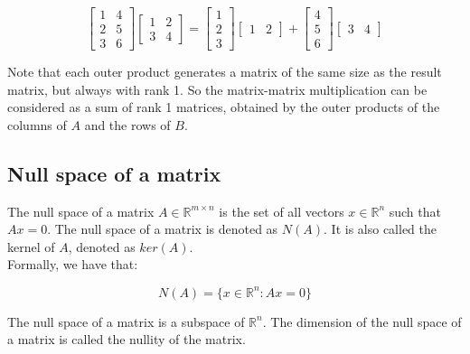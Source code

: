 \begin{equation}
    \begin{bmatrix}
        1 & 4 \\
        2 & 5 \\
        3 & 6
    \end{bmatrix} \begin{bmatrix}
        1 & 2 \\
        3 & 4
    \end{bmatrix} = \begin{bmatrix}
        1 \\
        2 \\
        3
    \end{bmatrix} \begin{bmatrix}
        1 & 2
    \end{bmatrix} + \begin{bmatrix}
        4 \\
        5 \\
        6
    \end{bmatrix} \begin{bmatrix}
        3 & 4
    \end{bmatrix}
\end{equation}

Note that each outer product generates a matrix of the same size as the result matrix, but always with rank 1. So 
the matrix-matrix multiplication can be considered as a sum of rank 1 matrices, obtained by the outer products of the columns of $A$
and the rows of $B$.

\subsection{Null space of a matrix}

The null space of a matrix $A \in \mathbb{R}^{m \times n}$ is the set of all vectors $x \in \mathbb{R}^n$ such that $Ax = 0$.
The null space of a matrix is denoted as $N(A)$. It is also called the kernel of $A$, denoted as $ker(A)$.\\

Formally, we have that:

\begin{equation}
    N(A) = \{ x \in \mathbb{R}^n : Ax = 0 \}
\end{equation}

The null space of a matrix is a subspace of $\mathbb{R}^n$. The dimension of the null space of a matrix is called the nullity 
of the matrix.

